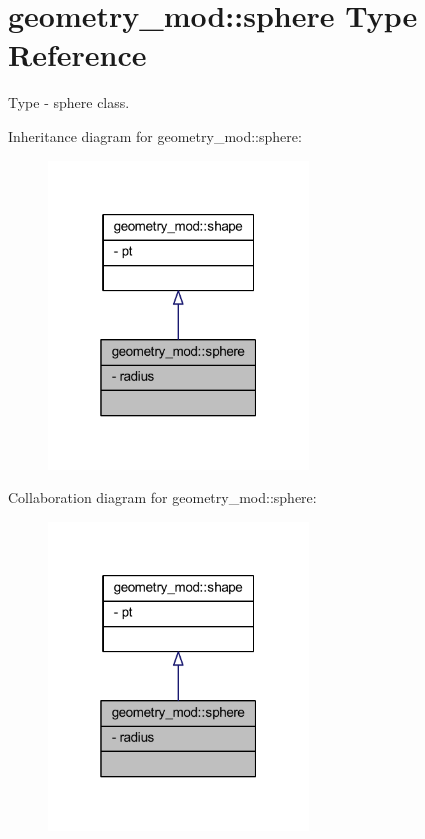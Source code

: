 \hypertarget{structgeometry__mod_1_1sphere}{}\section{geometry\+\_\+mod\+:\+:sphere Type Reference}
\label{structgeometry__mod_1_1sphere}


Type -\/ sphere class.  




Inheritance diagram for geometry\+\_\+mod\+:\+:sphere\+:\nopagebreak
\begin{figure}[H]
\begin{center}
\leavevmode
\includegraphics[width=196pt]{structgeometry__mod_1_1sphere__inherit__graph}
\end{center}
\end{figure}


Collaboration diagram for geometry\+\_\+mod\+:\+:sphere\+:\nopagebreak
\begin{figure}[H]
\begin{center}
\leavevmode
\includegraphics[width=196pt]{structgeometry__mod_1_1sphere__coll__graph}
\end{center}
\end{figure}
